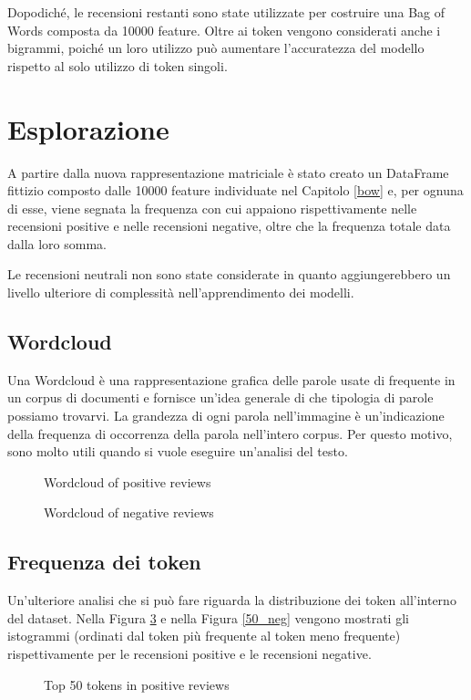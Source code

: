 Dopodiché, le recensioni restanti sono state utilizzate per costruire una Bag of Words composta da 10000 feature. Oltre ai token vengono considerati anche i bigrammi, poiché un loro utilizzo può aumentare l'accuratezza del modello rispetto al solo utilizzo di token singoli.
\section{Esplorazione}
A partire dalla nuova rappresentazione matriciale è stato creato un DataFrame fittizio composto dalle 10000 feature individuate nel Capitolo \ref{bow} e, per ognuna di esse, viene segnata la frequenza con cui appaiono rispettivamente nelle recensioni positive e nelle recensioni negative, oltre che la frequenza totale data dalla loro somma.
\par
Le recensioni neutrali non sono state considerate in quanto aggiungerebbero un livello ulteriore di complessità nell'apprendimento dei modelli.

\subsection{Wordcloud}
Una Wordcloud è una rappresentazione grafica delle parole usate di frequente in un corpus di documenti e fornisce un'idea generale di che tipologia di parole possiamo trovarvi. La grandezza di ogni parola nell'immagine è un'indicazione della frequenza di occorrenza della parola nell'intero corpus. Per questo motivo, sono molto utili quando si vuole eseguire un'analisi del testo.

\begin{figure}[H]
  \centering
  
  \caption{Wordcloud of positive reviews}
  \label{pos_wordcloud}
\end{figure}

\begin{figure}[H]
  \centering
  
  \caption{Wordcloud of negative reviews}
  \label{neg_wordcloud}
\end{figure}

\subsection{Frequenza dei token}

Un'ulteriore analisi che si può fare riguarda la distribuzione dei token all'interno del dataset. Nella Figura \ref{50_pos} e nella Figura \ref{50_neg} vengono mostrati gli istogrammi (ordinati dal token più frequente al token meno frequente) rispettivamente per le recensioni positive e le recensioni negative.
\begin{figure}[H]
  \centering
  
  \caption{Top 50 tokens in positive reviews}
  \label{50_pos}
\end{figure}

